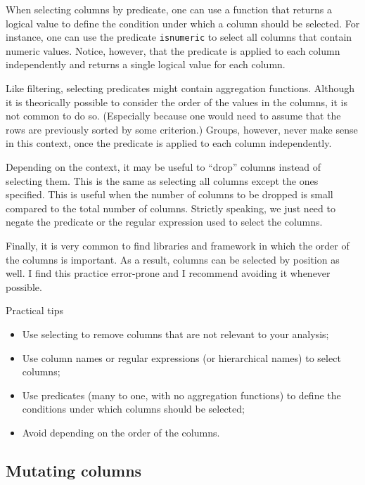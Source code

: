 When selecting columns by predicate, one can use a function that returns a logical value
to define the condition under which a column should be selected.  For instance, one can
use the predicate \texttt{isnumeric} to select all columns that contain numeric values.
Notice, however, that the predicate is applied to each column independently and returns a
single logical value for each column.

Like filtering, selecting predicates might contain aggregation functions.  Although it is
theorically possible to consider the order of the values in the columns, it is not common
to do so.  (Especially because one would need to assume that the rows are previously
sorted by some criterion.) Groups, however, never make sense in this context, once the
predicate is applied to each column independently.

Depending on the context, it may be useful to ``drop'' columns instead of selecting them.
This is the same as selecting all columns except the ones specified.  This is useful when
the number of columns to be dropped is small compared to the total number of columns.
Strictly speaking, we just need to negate the predicate or the regular expression used to
select the columns.

Finally, it is very common to find libraries and framework in which the order of the
columns is important.  As a result, columns can be selected by position as well.
I find this practice error-prone and I recommend avoiding it whenever possible.

\begin{hlbox}{Practical tips}
  \begin{itemize}
    \item Use selecting to remove columns that are not relevant to your analysis;
    \item Use column names or regular expressions (or hierarchical names) to select columns;
    \item Use predicates (many to one, with no aggregation functions) to define the conditions
      under which columns should be selected;
    \item Avoid depending on the order of the columns.
  \end{itemize}
\end{hlbox}

\subsection{Mutating columns}

